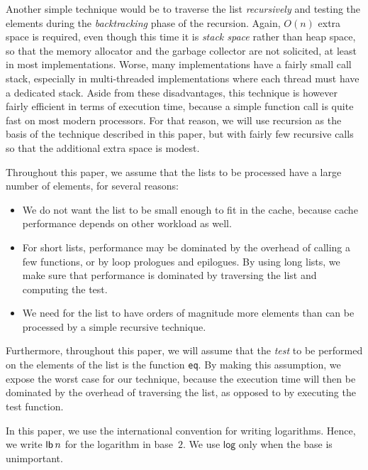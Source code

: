 Another simple technique would be to traverse the list
\emph{recursively} and testing the elements during the
\emph{backtracking} phase of the recursion.  Again, $O(n)$ extra space
is required, even though this time it is \emph{stack space} rather
than heap space, so that the memory allocator and the garbage
collector are not solicited, at least in most implementations.  Worse,
many implementations have a fairly small call stack, especially in
multi-threaded implementations where each thread must have a dedicated
stack.  Aside from these disadvantages, this technique is however
fairly efficient in terms of execution time, because a simple function
call is quite fast on most modern processors.  For that reason, we
will use recursion as the basis of the technique described in this
paper, but with fairly few recursive calls so that the additional
extra space is modest.

Throughout this paper, we assume that the lists to be processed have a
large number of elements, for several reasons:

\begin{itemize}
\item We do not want the list to be small enough to fit in the cache,
  because cache performance depends on other workload as well.
\item For short lists, performance may be dominated by the overhead of
  calling a few functions, or by loop prologues and epilogues.  By
  using long lists, we make sure that performance is dominated by
  traversing the list and computing the test.
\item We need for the list to have orders of magnitude more elements
  than can be processed by a simple recursive technique.
\end{itemize}

Furthermore, throughout this paper, we will assume that the
\emph{test} to be performed on the elements of the list is the
function \texttt{eq}.  By making this assumption, we expose the worst
case for our technique, because the execution time will then be
dominated by the overhead of traversing the list, as opposed to by
executing the test function.

In this paper, we use the international convention for writing
logarithms.  Hence, we write $\mathsf{lb}\thinspace n$ for the
logarithm in base~$2$.  We use $\mathsf{log}$ only when the base is
unimportant.

